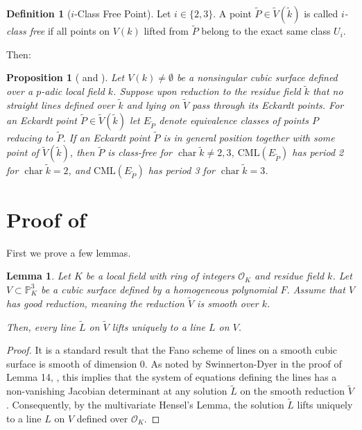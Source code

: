 \documentclass[11pt]{article}
\newtheorem{lemma}[theorem]{Lemma}
\newtheorem{proposition}[theorem]{Proposition}
\theoremstyle{definition}
\newtheorem{definition}[theorem]{Definition}
\newcommand{\CML}{\mathrm{CML}}
\DeclareMathOperator{\Char}{char}
\begin{document}
\begin{definition}[$i$-Class Free Point]
Let $i \in \{2, 3\}$. A point $\tilde{P} \in \tilde{V}(\tilde{k})$ is called \emph{$i$-class free} if all points on $V(k)$ lifted from $\tilde{P}$ belong to the exact same class $U_i$.
\end{definition}

Then:
\begin{proposition}[{\cite[Prop.~2.4]{dimitrikanevsky}} and ]
\label{thm:class-free}
Let $V(k) \ne \emptyset$ be a nonsingular cubic surface defined over a $p$-adic local field $k$. Suppose upon reduction to the residue field $\tilde{k}$ that no straight lines defined over $\tilde{k}$ and lying on $\tilde{V}$ pass through its Eckardt points. For an Eckardt point $\tilde{P} \in \tilde V(\tilde k)$ let $E_{\tilde{P}}$ denote equivalence classes of points $P$ reducing to $\tilde{P}$. If an Eckardt point $\tilde{P}$ is in general position together with some point of $\tilde{V}(\tilde{k})$, then $\tilde{P}$ is class-free for $\Char{\tilde{k}} \ne 2,3$,  $\CML(E_{\tilde{P}})$ has period 2 for $\Char{\tilde{k}} = 2$, and $\CML(E_{\tilde{P}})$ has period 3 for $\Char{\tilde{k}} = 3$.
\end{proposition}

\section{Proof of }
\label{sec:3-torsion-free}
First we prove a few lemmas.
\begin{lemma}
\label{thm:liftlines}
Let $K$ be a local field with ring of integers $\mathcal{O}_K$ and residue field $k$. Let $V \subset \mathbb{P}^3_K$ be a cubic surface defined by a homogeneous polynomial $F$. Assume that $V$ has good reduction, meaning the reduction $\tilde{V}$ is smooth over $k$.

Then, every line $\tilde{L}$ on $\tilde{V}$ lifts uniquely to a line $L$ on $V$.
\end{lemma}

\begin{proof}
It is a standard result that the Fano scheme of lines on a smooth cubic surface is smooth of dimension 0. As noted by Swinnerton-Dyer in the proof of Lemma 14,   \cite{swinnertondyer}, this implies that the system of equations defining the lines has a non-vanishing Jacobian determinant at any solution $\tilde{L}$ on the smooth reduction $\tilde{V}$. Consequently, by the multivariate Hensel’s Lemma, the solution $\tilde{L}$ lifts uniquely to a line $L$ on $V$ defined over $\mathcal{O}_K$.
\end{proof}
\end{document}
